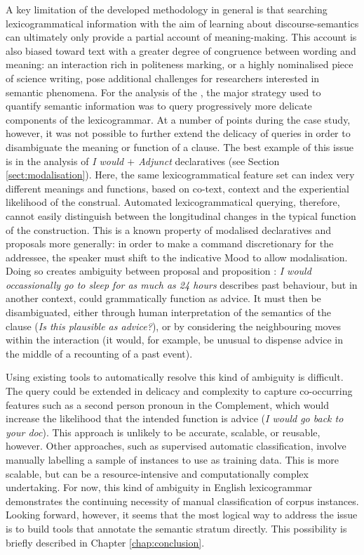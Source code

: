 A key limitation of the developed methodology in general is that searching lexicogrammatical information with the aim of learning about \glspl{discourse-semantic} can ultimately only provide a partial account of meaning\hyp{}making. This account is also biased toward text with a greater degree of congruence between wording and meaning: an interaction rich in politeness marking, or a highly nominalised piece of science writing, pose additional challenges for researchers interested in semantic phenomena. For the analysis of the , the major strategy used to quantify semantic information was to query progressively more delicate components of the \gls{lexicogrammar}. At a number of points during the case study, however, it was not possible to further extend the delicacy of queries in order to disambiguate the meaning or function of a clause. The best example of this issue is in the analysis of \emph{I would $+$ Adjunct} declaratives (see Section \ref{sect:modalisation}). Here, the same lexicogrammatical feature set can index very different meanings and functions, based on co\hyp{}text, context and the experiential likelihood of the construal. Automated lexicogrammatical querying, therefore, cannot easily distinguish between the longitudinal changes in the typical function of the construction. This is a known property of modalised declaratives and proposals more generally: in order to make a command discretionary for the addressee, the speaker must shift to the indicative Mood to allow modalisation. Doing so creates ambiguity between proposal and proposition \cite{halliday_introduction_2004}: \emph{I would occassionally go to sleep for as much as 24 hours} describes past behaviour, but in another context, could grammatically function as advice. It must then be disambiguated, either through human interpretation of the semantics of the clause (\emph{Is this plausible as advice?}), or by considering the neighbouring moves within the interaction (it would, for example, be unusual to dispense advice in the middle of a recounting of a past event).

Using existing tools to automatically resolve this kind of ambiguity is difficult. The query could be extended in delicacy and complexity to capture co\hyp{}occurring features such as a second person pronoun in the Complement, which would increase the likelihood that the intended function is advice (\emph{I would go back to your doc}). This approach is unlikely to be accurate, scalable, or reusable, however. Other approaches, such as supervised automatic classification, involve manually labelling a sample of instances to use as training data. This is more scalable, but can be a resource\hyp{}intensive and computationally complex undertaking. For now, this kind of ambiguity in English \gls{lexicogrammar} demonstrates the continuing necessity of manual classification of corpus instances. Looking forward, however, it seems that the most logical way to address the issue is to build tools that annotate the semantic stratum directly. This possibility is briefly described in Chapter \ref{chap:conclusion}.

